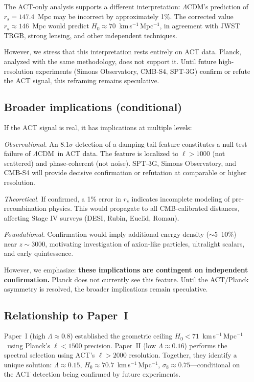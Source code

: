 \documentclass[twocolumn,showpacs,preprintnumbers,amsmath,amssymb,prd]{revtex4-2}
\newcommand{\lcdm}{$\Lambda$CDM}
\newcommand{\kms}{km\,s$^{-1}$\,Mpc$^{-1}$}
\begin{document}
The ACT-only analysis supports a different interpretation: \lcdm's prediction 
of $r_s = 147.4$~Mpc may be incorrect by approximately 1\%. The corrected value 
$r_s \approx 146$~Mpc would predict $H_0 \approx 70$~\kms, in agreement with 
JWST TRGB, strong lensing, and other independent techniques.

However, we stress that this interpretation rests entirely on ACT data. 
Planck, analyzed with the same methodology, does not support it. Until 
future high-resolution experiments (Simons Observatory, CMB-S4, SPT-3G) 
confirm or refute the ACT signal, this reframing remains speculative.

\subsection{Broader implications (conditional)}

If the ACT signal is real, it has implications at multiple levels:

\emph{Observational.} An 8.1$\sigma$ detection of a damping-tail feature 
constitutes a null test failure of \lcdm\ in ACT data. The feature is 
localized to $\ell > 1000$ (not scattered) and phase-coherent (not noise). 
SPT-3G, Simons Observatory, and CMB-S4 will provide decisive confirmation 
or refutation at comparable or higher resolution.

\emph{Theoretical.} If confirmed, a 1\% error in $r_s$ indicates incomplete 
modeling of pre-recombination physics. This would propagate to all 
CMB-calibrated distances, affecting Stage IV surveys (DESI, Rubin, 
Euclid, Roman).

\emph{Foundational.} Confirmation would imply additional energy density 
($\sim$5--10\%) near $z \sim 3000$, motivating investigation of axion-like 
particles, ultralight scalars, and early quintessence.

However, we emphasize: \textbf{these implications are contingent on 
independent confirmation.} Planck does not currently see this feature. 
Until the ACT/Planck asymmetry is resolved, the broader implications 
remain speculative.

\subsection{Relationship to Paper~I}

Paper~I (high $\Lambda \approx 0.8$) established the geometric ceiling 
$H_0 < 71$~\kms\ using Planck's $\ell < 1500$ precision. Paper~II (low 
$\Lambda \approx 0.16$) performs the spectral selection using ACT's 
$\ell > 2000$ resolution. Together, they identify a unique solution: 
$\Lambda \approx 0.15$, $H_0 \approx 70.7$~\kms, $\sigma_8 \approx 0.75$---conditional 
on the ACT detection being confirmed by future experiments.
\end{document}
